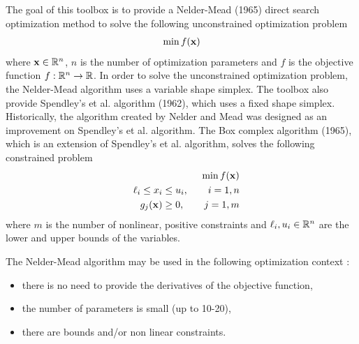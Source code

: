 The goal of this toolbox is to provide a Nelder-Mead (1965) direct search optimization method to solve the 
following unconstrained optimization problem
\begin{eqnarray}
\min f(\mathbf{x})
\end{eqnarray}
where $\mathbf{x}\in \mathbb{R}^n$, $n$ is the number of optimization parameters and $f$ is the objective 
function $f:\mathbb{R}^n\rightarrow \mathbb{R}$.
In order to solve the unconstrained optimization problem, the Nelder-Mead 
algorithm uses a variable shape simplex. The toolbox also provide Spendley's et al. 
algorithm \cite{Spendley1962} (1962), which uses a fixed shape simplex. Historically, the algorithm created  
by Nelder and Mead was designed as an improvement on Spendley's et al. algorithm.
The Box complex algorithm \cite{Box1965} (1965), which is an extension of Spendley's  et al. algorithm, solves the 
following constrained problem
\begin{eqnarray}
&&\min f(\mathbf{x})\\
&&\ell_i \leq x_i \leq u_i, \qquad i = 1,n\\
&&g_j(\mathbf{x})\geq 0, \qquad j = 1, m\\
\end{eqnarray}
where $m$ is the number of nonlinear, positive constraints and $\ell_i,u_i\in \mathbb{R}^n$ are the lower 
and upper bounds of the variables.

The Nelder-Mead algorithm may be used in the following optimization context :
\begin{itemize}
\item there is no need to provide the derivatives of the objective function,
\item the number of parameters is small (up to 10-20),
\item there are bounds and/or non linear constraints.
\end{itemize}

